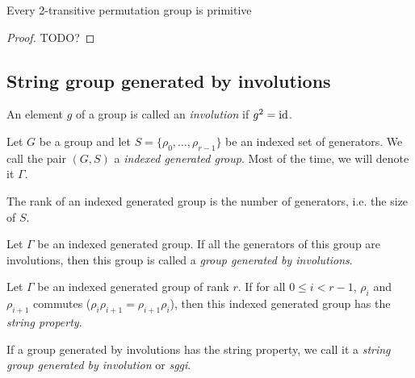 \begin{property}
  Every 2-transitive permutation group is primitive
\end{property}

\begin{proof}
  TODO?
\end{proof}

\subsection{String group generated by involutions}

\begin{definition}[Involution]
  An element $g$ of a group is called an \textit{involution} if $g^2 = \operatorname{id}$.
\end{definition}

\begin{definition}
  Let $G$ be a group and let $S = \{\rho_0, \dots, \rho_{r-1}\}$ be an indexed set of generators.
  We call the pair $(G,S)$ a \textit{indexed generated group}. Most of the time, we will denote it $\Gamma$.
\end{definition}

\begin{definition}
  The rank of an indexed generated group is the number of generators, i.e. the size of $S$.
\end{definition}

\begin{definition}
  Let $\Gamma$ be an indexed generated group. If all the generators of this group are involutions, then this group is called a \textit{group generated by involutions}.
\end{definition}

\begin{definition}
  Let $\Gamma$ be an indexed generated group of rank $r$. If for all $0 \le i < r-1$, $\rho_i$ and $\rho_{i+1}$ commutes ($\rho_i \rho_{i+1} = \rho_{i+1}\rho_i$), then this indexed generated group has the \textit{string property}.
\end{definition}

\begin{definition}
  If a group generated by involutions has the string property, we call it a \textit{string group generated by involution} or \textit{sggi}.
\end{definition}

